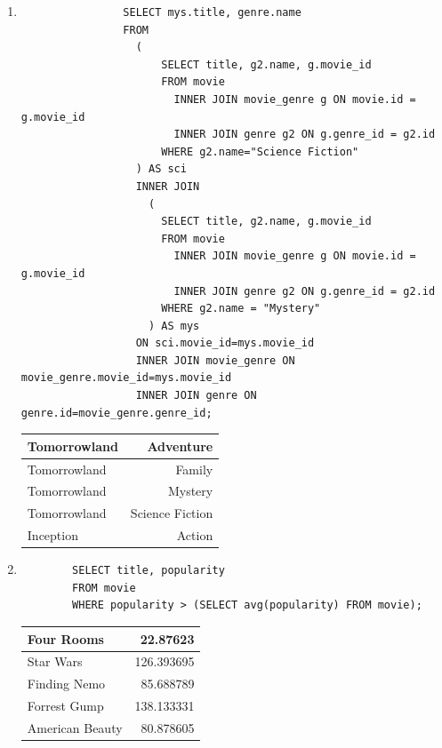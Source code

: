 \documentclass[11pt]{article}
\begin{document}
\begin{enumerate}
\begin{tabular}[t]{| l | r | }
			\hline
		\end{tabular}
	\pagebreak
	\item
		\begin{lstlisting}
                SELECT mys.title, genre.name
                FROM
                  (
                      SELECT title, g2.name, g.movie_id
                      FROM movie
                        INNER JOIN movie_genre g ON movie.id = g.movie_id
                        INNER JOIN genre g2 ON g.genre_id = g2.id
                      WHERE g2.name="Science Fiction"
                  ) AS sci
                  INNER JOIN
                    (
                      SELECT title, g2.name, g.movie_id
                      FROM movie
                        INNER JOIN movie_genre g ON movie.id = g.movie_id
                        INNER JOIN genre g2 ON g.genre_id = g2.id
                      WHERE g2.name = "Mystery"
                    ) AS mys
                  ON sci.movie_id=mys.movie_id
                  INNER JOIN movie_genre ON movie_genre.movie_id=mys.movie_id
                  INNER JOIN genre ON genre.id=movie_genre.genre_id;
		\end{lstlisting}
		\begin{tabular}[t]{| l | r | }
			\hline
			Tomorrowland & Adventure \\ \hline
			Tomorrowland & Family \\ \hline
			Tomorrowland & Mystery \\ \hline
			Tomorrowland & Science Fiction \\ \hline
			Inception & Action \\
			\hline
		\end{tabular}
	\item
		\begin{lstlisting}
		SELECT title, popularity
		FROM movie
		WHERE popularity > (SELECT avg(popularity) FROM movie);
		\end{lstlisting}
		\begin{tabular}[t]{| l | r | }
			\hline
			Four Rooms & 22.87623 \\ \hline
			Star Wars & 126.393695 \\ \hline
			Finding Nemo & 85.688789 \\ \hline
			Forrest Gump & 138.133331 \\ \hline
			American Beauty & 80.878605 \\
			\hline
		\end{tabular}



\end{enumerate}
\end{document}
